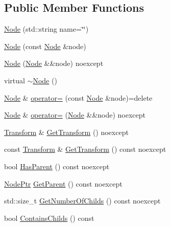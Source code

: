 \subsection*{Public Member Functions}
\begin{DoxyCompactItemize}
\item 
\mbox{\hyperlink{classmage_1_1_node_af546b12ffaefe122e59163b720d472cc}{Node}} (std\+::string name=\char`\"{}\char`\"{})
\item 
\mbox{\hyperlink{classmage_1_1_node_af9da591163469f210895f3a5b389d7cc}{Node}} (const \mbox{\hyperlink{classmage_1_1_node}{Node}} \&node)
\item 
\mbox{\hyperlink{classmage_1_1_node_a848ecb05c6b085cb4f27e38add85e64c}{Node}} (\mbox{\hyperlink{classmage_1_1_node}{Node}} \&\&node) noexcept
\item 
virtual \mbox{\hyperlink{classmage_1_1_node_a1369fc11b331abacbaf11aeb5729e871}{$\sim$\+Node}} ()
\item 
\mbox{\hyperlink{classmage_1_1_node}{Node}} \& \mbox{\hyperlink{classmage_1_1_node_ad10ea13608963acfa06d3c1577314da5}{operator=}} (const \mbox{\hyperlink{classmage_1_1_node}{Node}} \&node)=delete
\item 
\mbox{\hyperlink{classmage_1_1_node}{Node}} \& \mbox{\hyperlink{classmage_1_1_node_a10d0ed7f0ade94ce7cbd6f413ae82757}{operator=}} (\mbox{\hyperlink{classmage_1_1_node}{Node}} \&\&node) noexcept
\item 
\mbox{\hyperlink{classmage_1_1_transform}{Transform}} \& \mbox{\hyperlink{classmage_1_1_node_ad087f43f468552c7d4e2a4ea605b0220}{Get\+Transform}} () noexcept
\item 
const \mbox{\hyperlink{classmage_1_1_transform}{Transform}} \& \mbox{\hyperlink{classmage_1_1_node_aa8e2a3e9361dbdb4be23a8986f4ef082}{Get\+Transform}} () const noexcept
\item 
bool \mbox{\hyperlink{classmage_1_1_node_a2c1fe63ec1cb15321f0b0f5879227dcd}{Has\+Parent}} () const noexcept
\item 
\mbox{\hyperlink{classmage_1_1_node_ac575dc006e0ae1134277ade977dc06b6}{Node\+Ptr}} \mbox{\hyperlink{classmage_1_1_node_add9389d951ae864d7f92261398297089}{Get\+Parent}} () const noexcept
\item 
std\+::size\+\_\+t \mbox{\hyperlink{classmage_1_1_node_a2903aa37bb4fabb3535f1a42495508a0}{Get\+Number\+Of\+Childs}} () const noexcept
\item 
bool \mbox{\hyperlink{classmage_1_1_node_afd885043a9de1b0c09d1eb0ef7bf6006}{Contains\+Childs}} () const
\item 

\end{DoxyCompactItemize}
